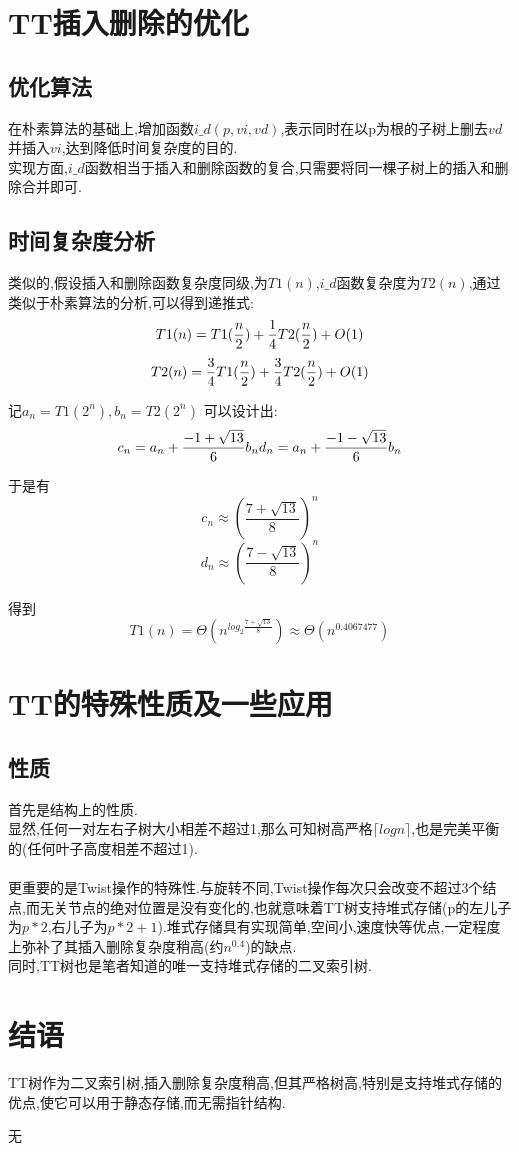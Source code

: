 \documentclass[UTF8]{ctexart}	%
\begin{document}
	\newpage
	
	\section{TT插入删除的优化}
	\subsection{优化算法}
		\indent 在朴素算法的基础上,增加函数$i\_d(p,vi,vd)$,表示同时在以p为根的子树上删去$vd$并插入$vi$,达到降低时间复杂度的目的.
		\\
		\indent 实现方面,$i\_d$函数相当于插入和删除函数的复合,只需要将同一棵子树上的插入和删除合并即可.
	\subsection{时间复杂度分析}
		\indent 类似的,假设插入和删除函数复杂度同级,为$T1(n)$,$i\_d$函数复杂度为$T2(n)$,通过类似于朴素算法的分析,可以得到递推式:
		$$
		T1(n)=T1(\frac n2)+\frac14\space T2(\frac n2)+O(1)
		$$$$
		T2(n)=\frac34\space T1(\frac n2)+\frac34\space T2(\frac n2)+O(1)
		$$


		记$a_n=T1(2^n),b_n=T2(2^n)$ 可以设计出:
		$$c_n=a_n+\frac{-1+\sqrt{13}}6b_n
		\\
		d_n=a_n+\frac{-1-\sqrt{13}}6b_n
		$$

		于是有
		$$c_n\approx(\frac{7+\sqrt{13}}8)^n
		$$$$
		d_n\approx(\frac{7-\sqrt{13}}8)^n
		$$
		
		得到
		$$
		T1(n)=\Theta(n^{log_2\frac{7+\sqrt{13}}8})\approx \Theta(n^{0.4067477})
		$$

	\newpage

	\section{TT的特殊性质及一些应用}
	\subsection{性质}
		\indent 首先是结构上的性质.
		\\
		\indent 显然,任何一对左右子树大小相差不超过1,那么可知树高严格$\lceil logn\rceil$,也是完美平衡的(任何叶子高度相差不超过1).
		\\ \\
		\indent 更重要的是Twist操作的特殊性.与旋转不同,Twist操作每次只会改变不超过3个结点,而无关节点的绝对位置是没有变化的,也就意味着\space TT树支持堆式存储(p的左儿子为$p*2$,右儿子为$p*2+1$).堆式存储具有实现简单,空间小,速度快等优点,一定程度上弥补了其插入删除复杂度稍高(约$n^{0.4}$)的缺点.
		\\
		\indent 同时,TT树也是笔者知道的唯一支持堆式存储的二叉索引树.
	
	\newpage
	
	\section{结语}
		\indent TT树作为二叉索引树,插入删除复杂度稍高,但其严格树高,特别是支持堆式存储的优点,使它可以用于静态存储,而无需指针结构.
	
	\begin{thebibliography}{99}  
		无
	
	\end{thebibliography}
	
\end{document}
